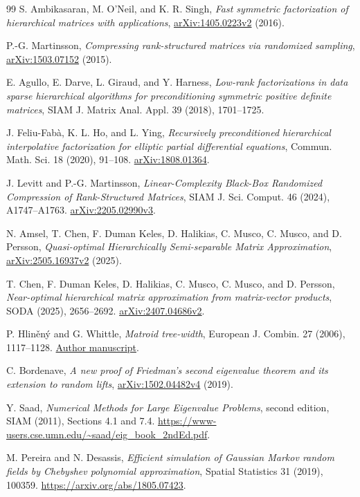 \documentclass[11pt]{amsart}
\theoremstyle{definition}\newtheorem{definition}[theorem]{Definition}
\theoremstyle{remark}\newtheorem{remark}[theorem]{Remark}
\numberwithin{equation}{section}
\begin{document}
\begin{thebibliography}{99}
 S. Ambikasaran, M. O'Neil, and K. R. Singh,
\emph{Fast symmetric factorization of hierarchical matrices with applications},
\href{https://arxiv.org/abs/1405.0223}{arXiv:1405.0223v2} (2016).

 P.-G. Martinsson,
\emph{Compressing rank-structured matrices via randomized sampling},
\href{https://arxiv.org/abs/1503.07152}{arXiv:1503.07152} (2015).

 E. Agullo, E. Darve, L. Giraud, and Y. Harness,
\emph{Low-rank factorizations in data sparse hierarchical algorithms for
preconditioning symmetric positive definite matrices},
SIAM J. Matrix Anal. Appl. 39 (2018), 1701--1725.

 J. Feliu-Fab\`a, K. L. Ho, and L. Ying,
\emph{Recursively preconditioned hierarchical interpolative factorization
for elliptic partial differential equations}, Commun. Math. Sci. 18
(2020), 91--108. \href{https://arxiv.org/abs/1808.01364}{arXiv:1808.01364}.

 J. Levitt and P.-G. Martinsson,
\emph{Linear-Complexity Black-Box Randomized Compression of Rank-Structured
Matrices}, SIAM J. Sci. Comput. 46 (2024), A1747--A1763.
\href{https://arxiv.org/abs/2205.02990}{arXiv:2205.02990v3}.

 N. Amsel, T. Chen, F. Duman Keles, D. Halikias,
C. Musco, C. Musco, and D. Persson,
\emph{Quasi-optimal Hierarchically Semi-separable Matrix Approximation},
\href{https://arxiv.org/abs/2505.16937}{arXiv:2505.16937v2} (2025).

 T. Chen, F. Duman Keles, D. Halikias,
C. Musco, C. Musco, and D. Persson,
\emph{Near-optimal hierarchical matrix approximation from matrix-vector
products}, SODA (2025), 2656--2692.
\href{https://arxiv.org/abs/2407.04686}{arXiv:2407.04686v2}.

 P. Hlin\v en\'y and G. Whittle,
\emph{Matroid tree-width}, European J. Combin. 27 (2006), 1117--1128.
\href{https://www.fi.muni.cz/~hlineny/papers/matr-tw-final.pdf}{Author manuscript}.

 C. Bordenave,
\emph{A new proof of Friedman's second eigenvalue theorem and its extension
to random lifts}, \href{https://arxiv.org/abs/1502.04482}{arXiv:1502.04482v4}
(2019).

 Y. Saad,
\emph{Numerical Methods for Large Eigenvalue Problems}, second edition,
SIAM (2011), Sections 4.1 and 7.4.
\url{https://www-users.cse.umn.edu/~saad/eig_book_2ndEd.pdf}.

 M. Pereira and N. Desassis,
\emph{Efficient simulation of Gaussian Markov random fields by Chebyshev
polynomial approximation}, Spatial Statistics 31 (2019), 100359.
\url{https://arxiv.org/abs/1805.07423}.
\end{thebibliography}
\end{document}
